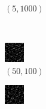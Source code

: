 \documentclass[a4paper, landscape]{article}
\begin{document}
\begin{figure}[H]
\begin{subfigure}{0.07\linewidth}
        \caption*{$(5, 1000)$}
    \end{subfigure}
    \\
    \begin{subfigure}{0.07\linewidth}
        \centering
        \includegraphics[width=\linewidth]{omp/k = 50, m = 100.png}
        \caption*{$(50, 100)$}
    \end{subfigure}
    \begin{subfigure}{0.07\linewidth}
        \centering
        \includegraphics[width=\linewidth]{omp/k = 50, m = 200.png}

\end{subfigure}
\end{figure}
\end{document}
